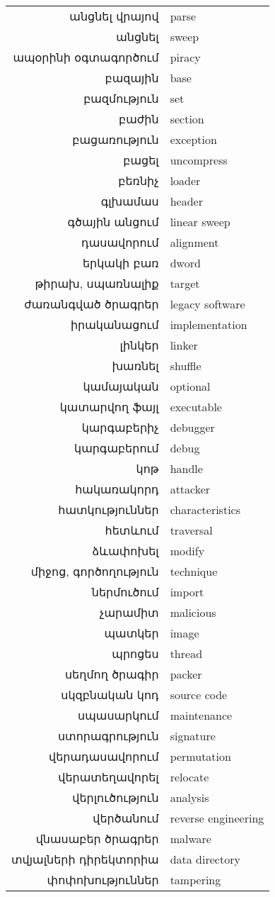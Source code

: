 \documentclass[11pt]{article}
\begin{document}
\begin{sloppypar}
\begin{tabular}{rl}
անցնել վրայով&parse \\
անցնել&sweep \\
ապօրինի օգտագործում&piracy \\
բազային&base \\
բազմություն&set \\
բաժին&section \\
բացառություն&exception \\
բացել&uncompress \\
բեռնիչ&loader \\
գլխամաս&header \\
գծային անցում&linear sweep \\
դասավորում&alignment \\
երկակի բառ&dword \\
թիրախ, սպառնալիք&target \\
ժառանգված ծրագրեր&legacy software \\
իրականացում&implementation \\
լինկեր&linker \\
խառնել&shuffle \\
կամայական&optional \\
կատարվող ֆայլ&executable \\
կարգաբերիչ&debugger \\
կարգաբերում&debug \\
կոթ&handle \\
հակառակորդ&attacker \\
հատկություններ&characteristics \\
հետևում&traversal \\
ձևափոխել&modify \\
միջոց, գործողություն&technique \\
ներմուծում&import \\
չարամիտ&malicious \\
պատկեր&image \\
պրոցես&thread \\
սեղմող ծրագիր&packer \\
սկզբնական կոդ&source code \\
սպասարկում&maintenance \\
ստորագրություն&signature \\
վերադասավորում&permutation \\
վերատեղավորել&relocate \\
վերլուծություն&analysis \\
վերծանում&reverse engineering \\
վնասաբեր ծրագրեր&malware \\
տվյալների դիրեկտորիա&data directory \\
փոփոխություններ&tampering \\
\end{tabular}


\end{sloppypar}
\end{document}
